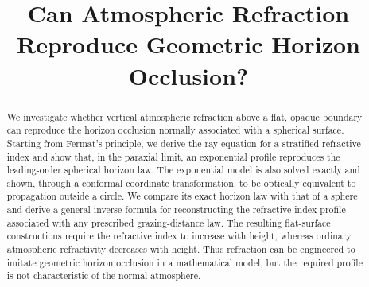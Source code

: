 \documentclass{article}
\title{Can Atmospheric Refraction Reproduce Geometric Horizon Occlusion?}
\author{}
\begin{document}
\maketitle
\begin{abstract}
We investigate whether vertical atmospheric refraction above a flat, opaque
boundary can reproduce the horizon occlusion normally associated with a
spherical surface. Starting from Fermat's principle, we derive the ray
equation for a stratified refractive index and show that, in the paraxial
limit, an exponential profile reproduces the leading-order spherical horizon
law. The exponential model is also solved exactly and shown, through a
conformal coordinate transformation, to be optically equivalent to propagation
outside a circle. We compare its exact horizon law with that of a sphere and
derive a general inverse formula for reconstructing the refractive-index
profile associated with any prescribed grazing-distance law. The resulting
flat-surface constructions require the refractive index to increase with
height, whereas ordinary atmospheric refractivity decreases with height.
Thus refraction can be engineered to imitate geometric horizon occlusion in a
mathematical model, but the required profile is not characteristic of the
normal atmosphere.
\end{abstract}












\end{document}

